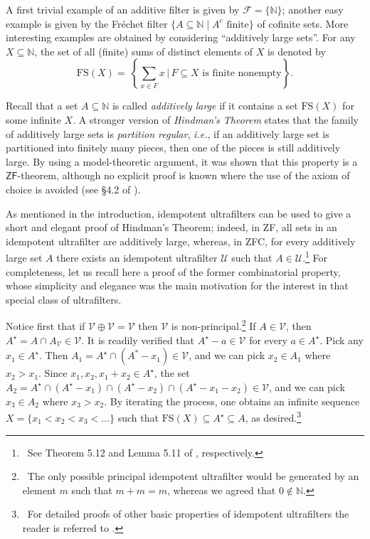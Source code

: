 \documentclass{amsart}
\theoremstyle{definition}
\theoremstyle{remark}
\def\F{\mathscr{F}}
\def\U{\mathscr{U}}
\def\V{\mathscr{V}}
\def\N{\mathbb{N}}
\begin{document}
A first trivial example of an additive filter is given by $\F=\{\N\}$;
another easy example is given by 
the Fr\'{e}chet filter $\{A\subseteq\N\mid A^c\text{ finite}\}$ of cofinite sets.
More interesting examples are obtained by considering
``additively large sets''.
For any $X\subseteq\N$,  
the set of all (finite) sums of distinct elements of $X$ is denoted by
$$\text{FS}(X) =\ \left\{\sum_{x\in F}x\,\Big|\,
F\subseteq X\text{ is finite nonempty}\right\}.$$

Recall that a set $A\subseteq\N$ is called 
\emph{additively large} if it contains
a set $\text{FS}(X)$ for some infinite $X$.
A stronger version of \emph{Hindman's Theorem}
states that the family of additively large
sets is \emph{partition regular}, \emph{i.e.}, if an additively
large set is partitioned into finitely many pieces, then
one of the pieces is still additively large.
By using a model-theoretic argument,
it was shown that this property is a $\textsf{ZF}$-theorem,
although no explicit proof is known
where the use of the axiom of choice is avoided
(see \S 4.2 of \cite{c}).

As mentioned in the introduction, idempotent ultrafilters
can be used to give a short and elegant proof
of Hindman's Theorem; indeed, in \textsf{ZF},
all sets in an idempotent
ultrafilter are additively large, whereas, in \textsf{ZFC},
for every additively large set $A$ there exists an
idempotent ultrafilter $\U$ such that $A\in\U$.\footnote
{~See Theorem 5.12 and Lemma 5.11 of \cite{hs}, respectively.}
For completeness, let us recall here a proof of the former 
combinatorial property, whose simplicity
and elegance was the main motivation 
for the interest in that special class of ultrafilters.

Notice first that if $\V\oplus\V=\V$ then
$\V$ is non-principal.\footnote
{~The only possible principal idempotent ultrafilter
would be generated by an element $m$ such that
$m+m=m$, whereas we agreed that $0\notin\N$.}
If $A\in\V$, then
$A^\star=A\cap A_\V\in\V$. It is readily verified
that $A^\star-a\in\V$ for every $a\in A^\star$. 
Pick any $x_1\in A^\star$. Then 
$A_1=A^\star\cap(A^*-x_1)\in\V$, and we can pick 
$x_2\in A_1$ where $x_2>x_1$.
Since $x_1,x_2,x_1+x_2\in A^\star$, the set 
$A_2=A^\star\cap(A^\star-x_1)\cap(A^\star-x_2)\cap(A^\star-x_1-x_2)\in\V$,
and we can pick $x_3\in A_2$ where $x_3>x_2$. 
By iterating the process,
one obtains an infinite sequence $X=\{x_1<x_2<x_3<\ldots\}$
such that $\text{FS}(X)\subseteq A^\star\subseteq A$, as desired.\footnote
{~For detailed proofs of other basic properties
of idempotent ultrafilters the reader is referred to \cite{hs}.}
\end{document}
